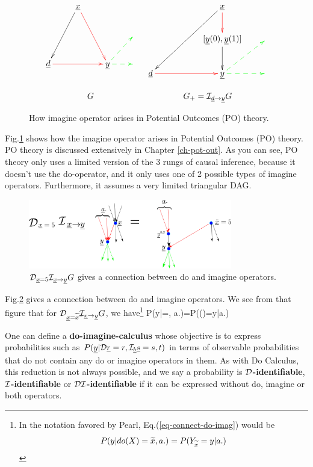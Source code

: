 \begin{figure}[h!]
$$
\begin{array}{ccccc}
\xymatrix{
&\rvx\ar@[red][ddr]\ar[ddl]
\\
&&&
\\
\rvd\ar@[red][rr]
&
&\rvy\ar@[green]@{-->}[r]
\ar@[green]@{-->}[ur]
&
}
&
\xymatrix{
&&\rvx\ar[ddll]\ar@[red][d]
\\
&&[\rvy(0),\rvy(1)]\ar[d]
&
\\
\rvd\ar@[red][rr]
&
&\rvy\ar@[green]@{-->}[r]
\ar@[green]@{-->}[ur]
&
}
\\
\\
G&G_+=\cali_{\rvd\rarrow\rvy}G
\end{array}
$$
\caption{How
 imagine operator
arises in
Potential Outcomes (PO)
theory.
}
\label{fig-counterf-G-im-y0-y1}
\end{figure}
Fig.\ref{fig-counterf-G-im-y0-y1}
shows how the
imagine operator arises
in Potential Outcomes (PO) theory.
PO theory is discussed extensively
in Chapter \ref{ch-pot-out}.
As you can see, PO theory
only uses a limited version
of the 3 rungs
of causal inference, because it
doesn't use the do-operator,
and it only uses one
of 2 possible types of
imagine operators.
Furthermore,
it assumes a
very limited triangular DAG.


\begin{figure}[h!]
\centering
\includegraphics[width=3.5in]
{counterf/rho-kappa.png}
\caption{${\cal D}_{{\underline{x}}=5}{\cal I}_{{\underline{x}}\rightarrow {\underline{y}}}G$
gives a connection
between do and imagine operators.
}
\label{fig-rho-kappa}
\end{figure}

Fig.\ref{fig-rho-kappa}
gives  a connection
between do and imagine
operators.
We see
from that figure that
for ${\cal D}_{{\underline{x}}={\widetilde{x}}}
{\cal I}_{{\underline{x}}\rightarrow{\underline{y}}}G$, we have\footnote{In the
notation favored by Pearl, Eq.(\ref{eq-connect-do-imag})
 would be
$$P(y|do(X)={\widetilde{x}}, a.)=P(Y_{{\widetilde{x}}}=y|a.)$$}
\beq
P(y|\cald\rvx=, a.)=P(\rvy()=y|a.)
\label{eq-connect-do-imag}
\eeq


One can define
a {\bf do-imagine-calculus}
whose
objective
is to
express
probabilities such as
$P({\underline{y}}|{\cal D}{\underline{r}}=r,
{\cal I}_{\underline{b}} {\underline{s}}=s, t)$
in terms of observable
probabilities
that do not
contain
any do or imagine
operators in them.
As with
Do Calculus,
this reduction
is not
always possible,
and we say a probability is
{\bf ${\cal D}$-identifiable},
{\bf ${\cal I}$-identifiable}
or
{\bf ${\cal D}{\cal I}$-identifiable}
if it  can be
expressed without do, imagine
or both operators.


